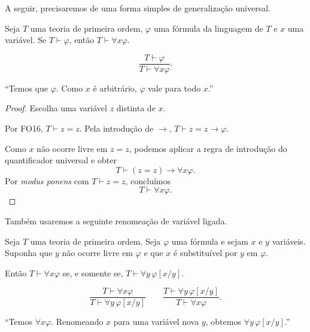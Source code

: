 A seguir, precisaremos de uma forma simples de generalização universal.

\begin{metalemma}\label{mlem:generalizacaoDeTeoremas}
    Seja $T$ uma teoria de primeira ordem, $\varphi$ uma fórmula da linguagem de $T$ e $x$ uma variável.
    Se $T\vdash \varphi$, então $T\vdash \forall x\varphi$.

    \[
        \frac{T\vdash \varphi}
             {T\vdash \forall x\varphi}.
    \]

    ``Temos que $\varphi$.
    Como $x$ é arbitrário, $\varphi$ vale para todo $x$.''
\end{metalemma}

\begin{proof}
    Escolha uma variável $z$ distinta de $x$.

    Por FO16, $T\vdash z=z$.
    Pela introdução de $\rightarrow$, $T\vdash z=z\rightarrow\varphi$.

    Como $x$ não ocorre livre em $z=z$, podemos aplicar a regra de introdução do quantificador universal e obter
    \[
        T\vdash (z=z)\rightarrow\forall x\varphi.
    \]
    Por \emph{modus ponens} com $T\vdash z=z$, concluímos
    \[
        T\vdash \forall x\varphi.
    \]
\end{proof}

Também usaremos a seguinte renomeação de variável ligada.

\begin{metalemma}\label{mlem:renomeacaoVariavelUniversal}
    Seja $T$ uma teoria de primeira ordem.
    Seja $\varphi$ uma fórmula e sejam $x$ e $y$ variáveis.
    Suponha que $y$ não ocorre livre em $\varphi$ e que $x$ é substituível por $y$ em $\varphi$.

    Então $T\vdash \forall x\varphi$ se, e somente se, $T\vdash \forall y\,\varphi[x/y]$.
    
    \[
        \frac{T\vdash \forall x\varphi}
             {T\vdash \forall y\,\varphi[x/y]}
        \qquad
        \frac{T\vdash \forall y\,\varphi[x/y]}
             {T\vdash \forall x\varphi}.
    \]

    ``Temos $\forall x\varphi$.
    Renomeando $x$ para uma variável nova $y$, obtemos $\forall y\,\varphi[x/y]$.''
\end{metalemma}

